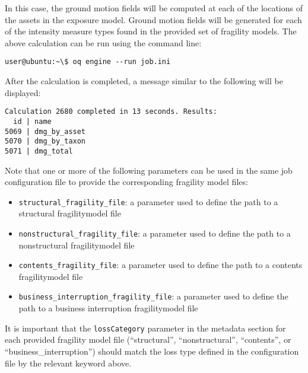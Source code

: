 In this case, the ground motion fields will be computed at each of the
locations of the assets in the exposure model. Ground motion fields will be
generated for each of the intensity measure types found in the provided set of
fragility models. The above calculation can be run using the command line:

\begin{verbatim}
user@ubuntu:~\$ oq engine --run job.ini
\end{verbatim}

After the calculation is completed, a message similar to the following will be
displayed:

\begin{verbatim}
Calculation 2680 completed in 13 seconds. Results:
  id | name
5069 | dmg_by_asset
5070 | dmg_by_taxon
5071 | dmg_total
\end{verbatim}

Note that one or more of the following parameters can be used in the same job
configuration file to provide the corresponding fragility model files:

\begin{itemize}

  \item \Verb+structural_fragility_file+: a parameter used to define the path
    to a structural \gls{fragilitymodel} file

  \item \Verb+nonstructural_fragility_file+: a parameter used to define the path
    to a nonstructural \gls{fragilitymodel} file

  \item \Verb+contents_fragility_file+: a parameter used to define the path
    to a contents \gls{fragilitymodel} file

  \item \Verb+business_interruption_fragility_file+: a parameter used to define
    the path to a business interruption \gls{fragilitymodel} file

\end{itemize}

It is important that the \Verb+lossCategory+ parameter in the metadata section
for each provided fragility model file (``structural'', ``nonstructural'',
``contents'', or ``business\_interruption'') should match the loss type
defined in the configuration file by the relevant keyword above.


